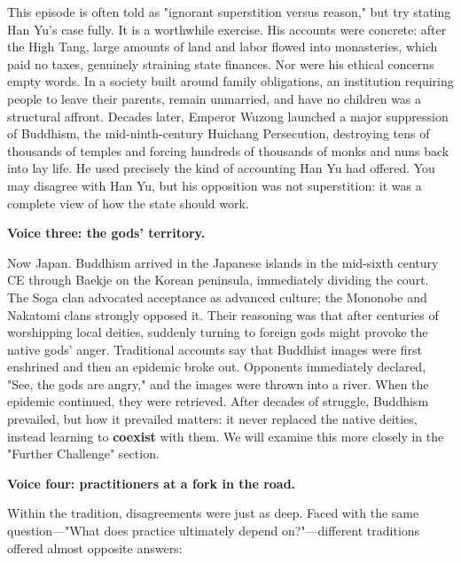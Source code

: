 This episode is often told as "ignorant superstition versus reason," but try stating Han Yu's case fully. It is a worthwhile exercise. His accounts were concrete: after the High Tang, large amounts of land and labor flowed into monasteries, which paid no taxes, genuinely straining state finances. Nor were his ethical concerns empty words. In a society built around family obligations, an institution requiring people to leave their parents, remain unmarried, and have no children was a structural affront. Decades later, Emperor Wuzong launched a major suppression of Buddhism, the mid-ninth-century Huichang Persecution, destroying tens of thousands of temples and forcing hundreds of thousands of monks and nuns back into lay life. He used precisely the kind of accounting Han Yu had offered. You may disagree with Han Yu, but his opposition was not superstition: it was a complete view of how the state should work.

\textbf{Voice three: the gods' territory.}

Now Japan. Buddhism arrived in the Japanese islands in the mid-sixth century CE through Baekje on the Korean peninsula, immediately dividing the court. The Soga clan advocated acceptance as advanced culture; the Mononobe and Nakatomi clans strongly opposed it. Their reasoning was that after centuries of worshipping local deities, suddenly turning to foreign gods might provoke the native gods' anger. Traditional accounts say that Buddhist images were first enshrined and then an epidemic broke out. Opponents immediately declared, "See, the gods are angry," and the images were thrown into a river. When the epidemic continued, they were retrieved. After decades of struggle, Buddhism prevailed, but how it prevailed matters: it never replaced the native deities, instead learning to \textbf{coexist} with them. We will examine this more closely in the "Further Challenge" section.

\textbf{Voice four: practitioners at a fork in the road.}

Within the tradition, disagreements were just as deep. Faced with the same question---"What does practice ultimately depend on?"---different traditions offered almost opposite answers:

